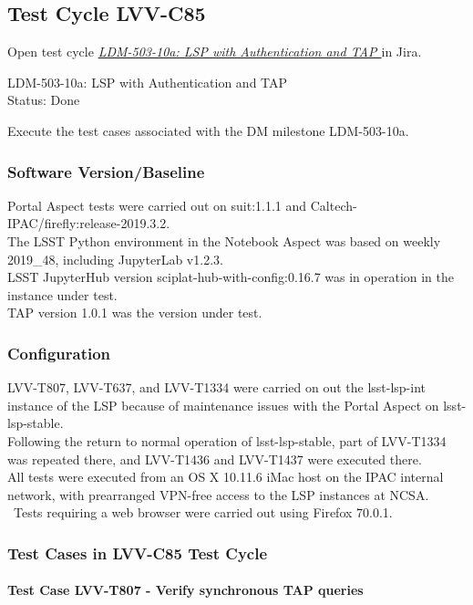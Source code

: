 \documentclass[DM,lsstdraft,STR,toc]{lsstdoc}
\begin{document}
\subsection{Test Cycle LVV-C85 }

Open test cycle {\it \href{https://jira.lsstcorp.org/secure/Tests.jspa#/testrun/LVV-C85}{LDM-503-10a: LSP with Authentication and TAP
}} in Jira.

LDM-503-10a: LSP with Authentication and TAP
\\
Status: Done

Execute the test cases associated with the DM milestone LDM-503-10a.


\subsubsection{Software Version/Baseline}
Portal Aspect tests were carried out on suit:1.1.1 and
Caltech-IPAC/firefly:release-2019.3.2.\\
The LSST Python environment in the Notebook Aspect was based on weekly
2019\_48, including JupyterLab v1.2.3.\\
LSST JupyterHub version sciplat-hub-with-config:0.16.7 was in operation
in the instance under test.\\
TAP version 1.0.1 was the version under test.


\subsubsection{Configuration}
LVV-T807, LVV-T637, and LVV-T1334 were carried on out the lsst-lsp-int
instance of the LSP because of maintenance issues with the Portal Aspect
on lsst-lsp-stable.\\
Following the return to normal operation of lsst-lsp-stable, part of
LVV-T1334 was repeated there, and LVV-T1436 and LVV-T1437 were executed
there.\\[2\baselineskip]All tests were executed from an OS X 10.11.6
iMac host on the IPAC internal network, with prearranged VPN-free access
to the LSP instances at NCSA. ~Tests requiring a web browser were
carried out using Firefox 70.0.1.


\subsubsection{Test Cases in LVV-C85 Test Cycle}

\paragraph{Test Case LVV-T807 - Verify synchronous TAP queries
 }\mbox{}\\
\end{document}
